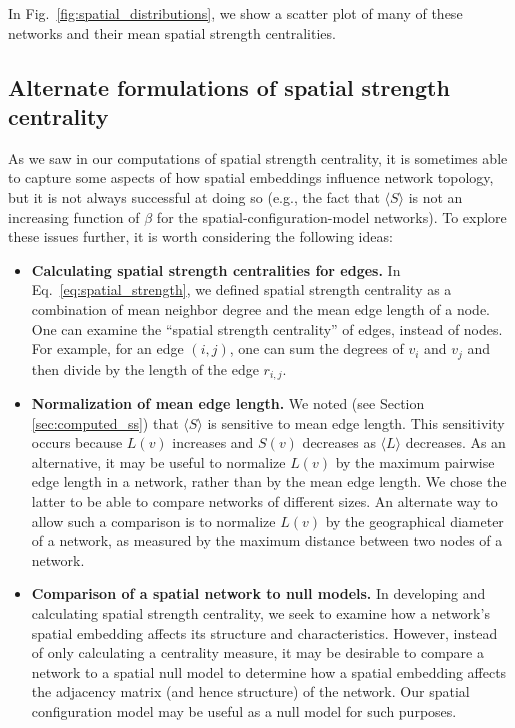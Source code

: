 \documentclass[%
 reprint,
 amsmath,amssymb,
 aps,
]{revtex4-1}
\begin{document}
In Fig.~\ref{fig:spatial_distributions}, we show a scatter plot of many of these networks and their mean spatial strength centralities.


\subsection{Alternate formulations of spatial strength centrality}\label{sec:alternate_formations}

As we saw in our computations of spatial strength centrality, it is sometimes able to capture some aspects of how spatial embeddings influence network topology, but it is not always successful at doing so (e.g., the fact that $\langle S \rangle$ is not an increasing function of $\beta$ for the spatial-configuration-model networks). To explore these issues further, it is worth considering the following ideas:
\begin{itemize}
    \item{\textbf{Calculating spatial strength centralities for edges.} In Eq.~\eqref{eq:spatial_strength}, we defined spatial strength centrality as a combination of mean neighbor degree and the mean edge length of a node. One can examine the ``spatial strength centrality'' of edges, instead of nodes. For example, for an edge $(i, j)$, one can sum the degrees of $v_i$ and $v_j$ and then divide by the length of the edge $r_{i,j}$. }
    \item{\textbf{Normalization of mean edge length.} We noted (see Section \ref{sec:computed_ss}) that $\langle S \rangle$ is sensitive to mean edge length. This sensitivity occurs because $L(v)$ increases and $S(v)$ decreases as $\langle L \rangle$ decreases. 
  As an alternative, it may be useful to normalize $L(v)$ by the maximum pairwise edge length in a network, rather than by the mean edge length. We chose the latter to be able to compare networks of different sizes. An alternate way to allow such a comparison
  is to normalize $L(v)$ by the geographical diameter of a network, 
  as measured by the maximum distance between two nodes of a network.
  }
    \item{\textbf{Comparison of a spatial network to null models.} In developing and calculating spatial strength centrality, we seek to examine how a network's spatial embedding affects its structure and characteristics. However, instead of only calculating a centrality measure, it may be desirable to compare a network to a spatial null model to determine how a spatial embedding affects the adjacency matrix (and hence structure) of the network. Our spatial configuration model may be useful as a null model for such purposes.}
\end{itemize}
\end{document}
